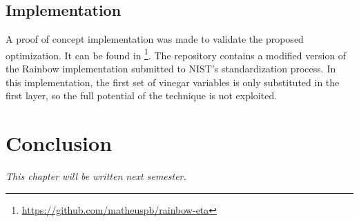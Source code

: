 \documentclass{ufsctex/ufsctex}
\begin{document}
\section{Implementation}

A proof of concept implementation was made to validate the proposed
optimization. It can be found in
\footnote{\url{https://github.com/matheuspb/rainbow-eta}}. The repository
contains a modified version of the Rainbow implementation submitted to NIST's
standardization process. In this implementation, the first set of vinegar
variables is only substituted in the first layer, so the full potential of the
technique is not exploited.

\chapter{Conclusion}

\textit{This chapter will be written next semester.}




\end{document}
